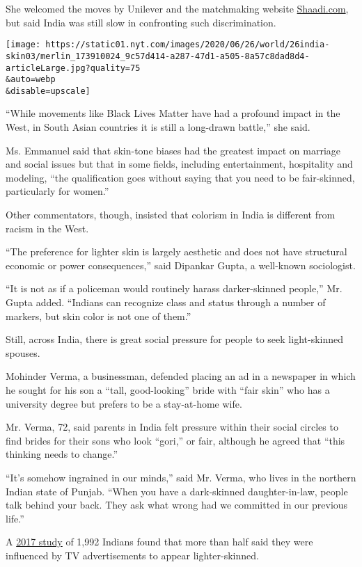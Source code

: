 She welcomed the moves by Unilever and the matchmaking website
\href{https://www.shaadi.com/}{Shaadi.com}, but said India was still
slow in confronting such discrimination.

\texttt{[image: https://static01.nyt.com/images/2020/06/26/world/26india-skin03/merlin\_173910024\_9c57d414-a287-47d1-a505-8a57c8dad8d4-articleLarge.jpg?quality=75\\\&auto=webp\\\&disable=upscale]}

``While movements like Black Lives Matter have had a profound impact in
the West, in South Asian countries it is still a long-drawn battle,''
she said.

Ms. Emmanuel said that skin-tone biases had the greatest impact on
marriage and social issues but that in some fields, including
entertainment, hospitality and modeling, ``the qualification goes
without saying that you need to be fair-skinned, particularly for
women.''

Other commentators, though, insisted that colorism in India is different
from racism in the West.

``The preference for lighter skin is largely aesthetic and does not have
structural economic or power consequences,'' said Dipankar Gupta, a
well-known sociologist.

``It is not as if a policeman would routinely harass darker-skinned
people,'' Mr. Gupta added. ``Indians can recognize class and status
through a number of markers, but skin color is not one of them.''

Still, across India, there is great social pressure for people to seek
light-skinned spouses.

Mohinder Verma, a businessman, defended placing an ad in a newspaper in
which he sought for his son a ``tall, good-looking'' bride with ``fair
skin'' who has a university degree but prefers to be a stay-at-home
wife.

Mr. Verma, 72, said parents in India felt pressure within their social
circles to find brides for their sons who look ``gori,'' or fair,
although he agreed that ``this thinking needs to change.''

``It's somehow ingrained in our minds,'' said Mr. Verma, who lives in
the northern Indian state of Punjab. ``When you have a dark-skinned
daughter-in-law, people talk behind your back. They ask what wrong had
we committed in our previous life.''

A \href{https://www.ncbi.nlm.nih.gov/pmc/articles/PMC5787082/\#B2}{2017
study} of 1,992 Indians found that more than half said they were
influenced by TV advertisements to appear lighter-skinned.

